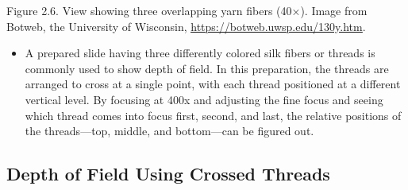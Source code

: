 \documentclass[
  letterpaper,
  DIV=11,
  numbers=noendperiod]{scrreprt}
\providecommand{\tightlist}{%
  \setlength{\itemsep}{0pt}\setlength{\parskip}{0pt}}
\begin{document}
Figure 2.6. View showing three overlapping yarn fibers (40×). Image from
Botweb, the University of Wisconsin,
\href{https://botweb.uwsp.edu/130y.htm}{\ul{https://botweb.uwsp.edu/130y.htm}}.

\begin{itemize}
\tightlist
\item
  A prepared slide having three differently colored silk fibers or
  threads is commonly used to show depth of field. In this preparation,
  the threads are arranged to cross at a single point, with each thread
  positioned at a different vertical level. By focusing at 400x and
  adjusting the fine focus and seeing which thread comes into focus
  first, second, and last, the relative positions of the threads---top,
  middle, and bottom---can be figured out.
\end{itemize}

\subsection{\texorpdfstring{\textbf{Depth of Field Using Crossed
Threads}}{Depth of Field Using Crossed Threads}}\label{depth-of-field-using-crossed-threads}
\end{document}
